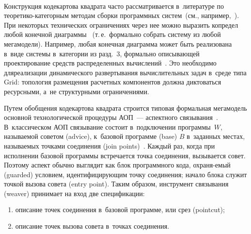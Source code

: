 \begin{multicols}{2}
 \begin{center}
 \mbox{%
 \epsfxsize=64.305mm
 }
 \end{center}
   
   Конструкция кодекартова квадрата часто рассматривается в~литературе по 
тео\-ре\-ти\-ко-ка\-те\-гор\-ным методам сборки программных систем~(см.,\linebreak
например,~\cite{32-kov}). 
При некоторых технических ограничениях через нее можно выразить 
копредел любой конечной диаграммы~\cite{11-kov} (т.\,е.\ формально собрать 
систему из любой мегамодели). Например, любая конечная диаграмма может 
быть реализована в~виде системы в~категории из разд.~3, формально\linebreak 
описывающей проектирование средств распределенных  
вычислений~\cite{26-kov}. Это необходимо для\linebreak реализации динамического 
развертывания вы\-чис\-лительных задач в~среде типа Grid: топология размещения 
расчетных компонентов должна диктоваться ресурсными, а~не структурными 
ограничениями.
   
   Путем обобщения кодекартова квадрата строится типовая формальная 
мегамодель основной технологической процедуры АОП~--- аспектного 
связывания~\cite{20-kov}. В~классическом АОП связывание состоит 
в~подключении программы~$W$, называемой советом (advice), к~базовой 
программе (base) $B$ в~заданных местах, называемых точками соединения (join 
points)~\cite{33-kov}. Каждый раз, когда при исполнении базовой программы 
встречается точка соединения, вызывается совет. Поэтому аспект обычно 
выглядит как блок программного кода, охра\-ня-\linebreak емый (guarded) условием, 
идентифицирующим точку соединения; начало блока служит точкой вызова 
совета (entry point). Таким образом, инструмент связывания (weaver) принимает 
на вход две спецификации:
   \begin{enumerate}[(1)]
\item описание точек соединения в~базовой программе, или срез (pointcut);
\item описание точек вызова совета в~точках соединения.
\end{enumerate}


\end{multicols}

